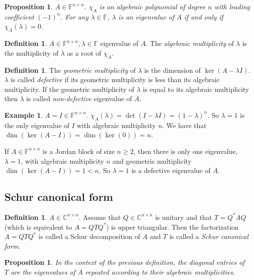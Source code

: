 \documentclass[12pt]{article}
\newtheorem{proposition}[theorem]{Proposition}
\theoremstyle{definition}
\newtheorem{definition}[theorem]{Definition}
\newtheorem*{example*}{Example}
\theoremstyle{remark}
\numberwithin{equation}{section}
\newcommand{\F}{\mathbb{F}}
\newcommand{\C}{\mathbb{C}}
\begin{document}
\begin{proposition}
  \label{prop:charpoly-eigenvalues}
  $A \in \F^{n \times n}$. $\chi_A$ is an algebraic polynomial of degree $n$ with leading coefficient $(-1)^n$. For any $\lambda \in \F$, $\lambda$ is an eigenvalue of $A$ if and only if $\chi_A(\lambda) = 0$.
\end{proposition}
\begin{definition}
  \label{def:alg-mult}
  $A \in \F^{n \times n}, \lambda \in \F$ eigenvalue of $A$. The \emph{algebraic multiplicity} of $\lambda$ is the multiplicity of $\lambda$ as a root of $\chi_A$.
\end{definition}
\begin{definition}
  \label{def:geom-mult}
  The \emph{geometric multiplicity} of $\lambda$ is the dimension of $\ker(A - \lambda I)$. $\lambda$ is called \emph{defective} if its geometric multiplicity is less than its algebraic multiplicity. If the geometric multiplicity of $\lambda$ is equal to its algebraic multiplicity then $\lambda$ is called \emph{non-defective} eigenvalue of $A$.
\end{definition}

\begin{example*}
  $A = I \in \F^{n \times n}$. $\chi_A(\lambda) = \det(I - \lambda I) = (1-\lambda)^n$. So $\lambda=1$ is the only eigenvalue of $I$ with algebraic multiplicity $n$. We have that $\dim (\ker (A-I)) =  \dim( \ker (0)) = n$.

  If $A \in \F^{n \times n}$ is a Jordan block of size $n \geq 2$, then there is only one eigenvalue, $\lambda=1$, with algebraic multiplicity $n$ and geometric multiplicity $\dim(\ker(A-I)) = 1<n$. So $\lambda=1$ is a defective eigenvalue of $A$.
\end{example*}

\subsection*{Schur canonical form}
\begin{definition}
  $A\in \C^{n\times n}$. Assume that $Q \in \C^{n\times n}$ is unitary and that $T= Q^*AQ$ (which is equivalent to $A = QTQ^*$) is upper triangular. Then the factorization $A = QTQ^*$ is called a Schur decomposition of $A$ and $T$ is called a \emph{Schur canonical form}.
\end{definition}

\begin{proposition}
  In the context of the previous definition, the diagonal entries of $T$ are the eigenvalues of $A$ repeated according to their algebraic multiplicities.
\end{proposition}
\end{document}
